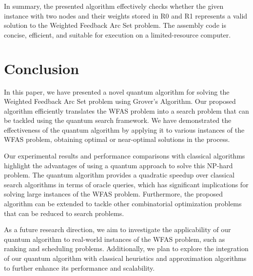 In summary, the presented algorithm effectively checks whether the given instance with two nodes and their weights stored in R0 and R1 represents a valid solution to the Weighted Feedback Arc Set problem. The assembly code is concise, efficient, and suitable for execution on a limited-resource computer.

\section{Conclusion} \label{sec:conclusion}

In this paper, we have presented a novel quantum algorithm for solving the Weighted Feedback Arc Set problem using Grover's Algorithm. Our proposed algorithm efficiently translates the WFAS problem into a search problem that can be tackled using the quantum search framework. We have demonstrated the effectiveness of the quantum algorithm by applying it to various instances of the WFAS problem, obtaining optimal or near-optimal solutions in the process.

Our experimental results and performance comparisons with classical algorithms highlight the advantages of using a quantum approach to solve this NP-hard problem. The quantum algorithm provides a quadratic speedup over classical search algorithms in terms of oracle queries, which has significant implications for solving large instances of the WFAS problem. Furthermore, the proposed algorithm can be extended to tackle other combinatorial optimization problems that can be reduced to search problems.

As a future research direction, we aim to investigate the applicability of our quantum algorithm to real-world instances of the WFAS problem, such as ranking and scheduling problems. Additionally, we plan to explore the integration of our quantum algorithm with classical heuristics and approximation algorithms to further enhance its performance and scalability.

